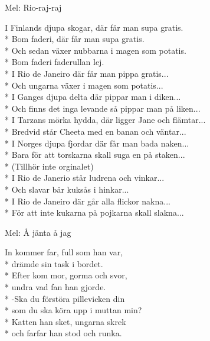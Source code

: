 \begin{SongText}
    \begin{SongInfo}
        Mel: Rio-raj-raj
    \end{SongInfo}
    \begin{SongVerse}
        I Finlands djupa skogar, där får man supa gratis.\\*%
        Bom faderi, där får man supa gratis.\\*%
        Och sedan växer nubbarna i magen som potatis.\\*%
        Bom faderi faderullan lej.\\*%
        I Rio de Janeiro där får man pippa gratis...\\*%
        Och ungarna växer i magen som potatis...\\*%
        I Ganges djupa delta där pippar man i diken...\\*%
        Och finns det inga levande så pippar man på liken...\\*%
        I Tarzans mörka hydda, där ligger Jane och flämtar...\\*%
        Bredvid står Cheeta med en banan och väntar...\\*%
        I Norges djupa fjordar där får man bada naken...\\*%
        Bara för att torskarna skall suga en på staken...\\*%
        (Tillhör inte orginalet)\\*%
        I Rio de Janerio står ludrena och vinkar...\\*%
        Och slavar bär kuksås i hinkar...\\*%
        I Rio de Janeiro där går alla flickor nakna...\\*%
        För att inte kukarna på pojkarna skall slakna...
    \end{SongVerse}
\end{SongText}
\begin{SongText}
    \begin{SongInfo}
        Mel: Å jänta å jag
    \end{SongInfo}
    \begin{SongVerse}
        In kommer far, full som han var,\\*%
        drämde sin task i bordet.\\*%
        Efter kom mor, gorma och svor,\\*%
        undra vad fan han gjorde.\\*%
        -Ska du förstöra pillevicken din\\*%
        som du ska köra upp i muttan min?\\*%
        Katten han sket, ungarna skrek\\*%
        och farfar han stod och runka.
    \end{SongVerse}
\end{SongText}
